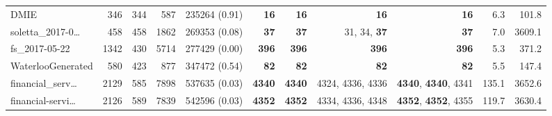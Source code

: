 \begin{table*}
\begin{tiny}
{{\begin{tabular}{lrrrrrrrrrr}
DMIE & \num[text-series-to-math=true]{346} & \num[text-series-to-math=true]{344} & \num[text-series-to-math=true]{587} & \num[text-series-to-math=true]{235264} (\num[text-series-to-math=true]{0.91}) & \textbf{\num[text-series-to-math=true]{16}} & \textbf{\num[text-series-to-math=true]{16}} & \textbf{\num[text-series-to-math=true]{16}} & \textbf{\num[text-series-to-math=true]{16}} & 6.3 & 101.8\\
soletta\_2017-0\ldots & \num[text-series-to-math=true]{458} & \num[text-series-to-math=true]{458} & \num[text-series-to-math=true]{1862} & \num[text-series-to-math=true]{269353} (\num[text-series-to-math=true]{0.08}) & \textbf{\num[text-series-to-math=true]{37}} & \textbf{\num[text-series-to-math=true]{37}} & \num[text-series-to-math=true]{31}, \num[text-series-to-math=true]{34}, \textbf{\num[text-series-to-math=true]{37}} & \textbf{\num[text-series-to-math=true]{37}} & 7.0 & 3609.1\\
fs\_2017-05-22 & \num[text-series-to-math=true]{1342} & \num[text-series-to-math=true]{430} & \num[text-series-to-math=true]{5714} & \num[text-series-to-math=true]{277429} (\num[text-series-to-math=true]{0.00}) & \textbf{\num[text-series-to-math=true]{396}} & \textbf{\num[text-series-to-math=true]{396}} & \textbf{\num[text-series-to-math=true]{396}} & \textbf{\num[text-series-to-math=true]{396}} & 5.3 & 371.2\\
WaterlooGenerated & \num[text-series-to-math=true]{580} & \num[text-series-to-math=true]{423} & \num[text-series-to-math=true]{877} & \num[text-series-to-math=true]{347472} (\num[text-series-to-math=true]{0.54}) & \textbf{\num[text-series-to-math=true]{82}} & \textbf{\num[text-series-to-math=true]{82}} & \textbf{\num[text-series-to-math=true]{82}} & \textbf{\num[text-series-to-math=true]{82}} & 5.5 & 147.4\\
financial\_serv\ldots & \num[text-series-to-math=true]{2129} & \num[text-series-to-math=true]{585} & \num[text-series-to-math=true]{7898} & \num[text-series-to-math=true]{537635} (\num[text-series-to-math=true]{0.03}) & \textbf{\num[text-series-to-math=true]{4340}} & \textbf{\num[text-series-to-math=true]{4340}} & \num[text-series-to-math=true]{4324}, \num[text-series-to-math=true]{4336}, \num[text-series-to-math=true]{4336} & \textbf{\num[text-series-to-math=true]{4340}}, \textbf{\num[text-series-to-math=true]{4340}}, \num[text-series-to-math=true]{4341} & 135.1 & 3652.6\\
financial-servi\ldots & \num[text-series-to-math=true]{2126} & \num[text-series-to-math=true]{589} & \num[text-series-to-math=true]{7839} & \num[text-series-to-math=true]{542596} (\num[text-series-to-math=true]{0.03}) & \textbf{\num[text-series-to-math=true]{4352}} & \textbf{\num[text-series-to-math=true]{4352}} & \num[text-series-to-math=true]{4334}, \num[text-series-to-math=true]{4336}, \num[text-series-to-math=true]{4348} & \textbf{\num[text-series-to-math=true]{4352}}, \textbf{\num[text-series-to-math=true]{4352}}, \num[text-series-to-math=true]{4355} & 119.7 & 3630.4\\

\end{tabular}}}
\end{tiny}
\end{table*}
